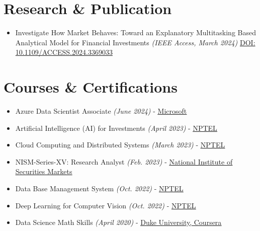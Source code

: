 \documentclass[11pt,a4paper,sans]{moderncv}
\makeatletter
\newcommand*{\customcventry}[7][.13em]{
\begin{tabular}{@{}l}
{\bfseries #4} \
{\itshape #3}
\end{tabular}
\hfill
\begin{tabular}{l@{}}
{\bfseries #5} \
{\itshape #2}
\end{tabular}
\ifx&#7&%
\else{\
\begin{minipage}{\maincolumnwidth}%
\small#7%
\end{minipage}}\fi%
\par\addvspace{#1}}
\makeatother
\begin{document}
\section{Research \& Publication}
{\begin{itemize}[label=\textbullet]
    \item Investigate How Market Behaves: Toward an Explanatory Multitasking Based Analytical Model for Financial Investments \textit{(IEEE Access, March 2024)} \color{blue}\href{DOI: 10.1109/ACCESS.2024.3369033}{DOI: 10.1109/ACCESS.2024.3369033}
\end{itemize}}




\section{Courses \& Certifications}
{\begin{itemize}[label=\textbullet]
    \item Azure Data Scientist Associate \textit{(June 2024)} - \underline{\color{blue}\href{https://learn.microsoft.com/api/credentials/share/en-us/u77w41/6DED7CA0675E173B?sharingId=2E0F4AA6DCCB6C73}{Microsoft}}
    \item Artificial Intelligence (AI) for Investments \textit{(April 2023)} - \underline{\color{blue}\href{https://onlinecourses.nptel.ac.in/noc23_mg63/preview}{NPTEL}}
    \item Cloud Computing and Distributed Systems \textit{(March 2023)} - \underline{\color{blue}\href{https://onlinecourses.nptel.ac.in/noc21_cs15/preview}{NPTEL}}
    \item NISM-Series-XV: Research Analyst \textit{(Feb. 2023)} - \underline{\color{blue}\href{https://www.nism.ac.in/}{National Institute of Securities Markets}}
    \item Data Base Management System \textit{(Oct. 2022)} - \underline{\color{blue}\href{https://onlinecourses.nptel.ac.in/noc21_cs04/preview}{NPTEL}}
    \item Deep Learning for Computer Vision \textit{(Oct. 2022)} - \underline{\color{blue}\href{https://onlinecourses.nptel.ac.in/noc23_cs126/preview}{NPTEL}}
    \item Data Science Math Skills \textit{(April 2020)} - \underline{\color{blue}\href{https://www.coursera.org/learn/datasciencemathskills}{Duke University, Coursera}} 
\end{itemize}}
\end{document}

